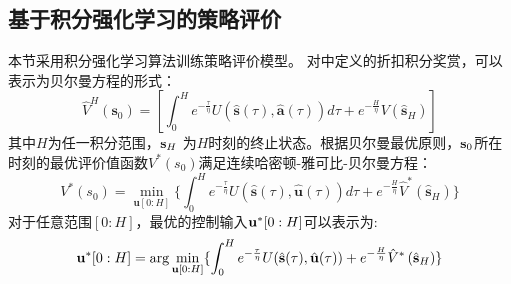 \subsection{基于积分强化学习的策略评价}
本节采用积分强化学习算法\cite{Guo2019}训练策略评价模型。
对中定义的折扣积分奖赏，可以表示为贝尔曼方程的形式：
\begin{equation}
  \hat{V}^{H}\left(\mathbf{s}_{0}\right)=\left[\int_{0}^{H} e^{-\frac{\tau}{\eta}} U(\hat{\mathbf{s}}(\tau), \hat{\mathbf{a}}(\tau)) d \tau+e^{-\frac{H}{\eta}} {V}\left(\hat{\mathbf{s}}_{H}\right)\right]
  \label{equ:J_bellman}
\end{equation}
其中$H$为任一积分范围，$\mathbf s_H$ 为$H$时刻的终止状态。根据贝尔曼最优原则，$\mathbf s_0$所在时刻的最优评价值函数$V^*(s_0)$满足连续哈密顿-雅可比-贝尔曼方程：
\begin{equation}
\label{equ:J_star} 
V ^ { * } \left( s_0 \right) = \min _{ \mathbf u[0:H ] } \{ \int_0^H e^{-\frac{\tau}{\eta}} U(\hat{\mathbf{s}}(\tau), \hat{\mathbf{u}}(\tau)) d\tau  + e^{-\frac{H}{\eta}} \hat{V}^*\left(\hat{\mathbf{s}}_{H}\right)\}
\end{equation}
对于任意范围$[0:H]$，最优的控制输入$\mathbf u^*[0:H]$可以表示为:
\begin{equation}
\mathbf u^*[  0:H ] =\arg \min _ { \mathbf u[0:H ] }\{ \int_0^H e^{-\frac{\tau}{\eta}} U(\hat{\mathbf{s}}(\tau), \hat{\mathbf{u}}(\tau))  + e^{-\frac{H}{\eta}} \hat{V}^*\left(\hat{\mathbf{s}}_{H}\right)\}
\label{equ:VI_u}
\end{equation}


